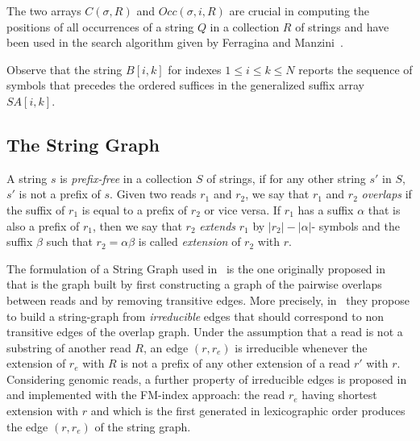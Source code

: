 \documentclass[runningheads,envcountsame,a4paper]{llncs}
\begin{document}

The two arrays $C(\sigma, R)$ and $Occ(\sigma, i, R)$ are crucial in
computing the positions of all occurrences of a string $Q$ in a
collection $R$ of strings and have been used in the search algorithm
given by Ferragina and Manzini~\cite{Ferragina2000}.

Observe that the string $B[i,k]$ for indexes $1 \leq i \leq k \leq N$
reports the sequence of symbols that precedes the ordered suffices in
the generalized suffix array $SA[i,k]$.





\subsection{The String Graph}


A string $s$ is \emph{prefix-free} in a collection $S$ of strings, if
for any other string $s'$ in $S$, $s'$ is not a prefix of $s$.
Given two reads $r_1$ and $r_2$, we say that $r_1$ and $r_2$
\emph{overlaps} if the suffix of $r_1$ is equal to a prefix of $r_2$ or
vice versa.
If $r_1$ has a suffix $\alpha$ that is also a prefix of $r_1$, then we
say that $r_2$ \emph{extends} $r_1$ by $|r_2|- |\alpha|$- symbols and
the suffix $\beta$ such that $r_2 = \alpha \beta$ is called
\emph{extension} of $r_2$ with $r$.

The formulation of a String Graph used in~\cite{Simpson2010} is the one
originally proposed in~\cite{Myers2005} that is the graph built by first
constructing a graph of the pairwise overlaps between reads and by
removing transitive edges.
More precisely, in~\cite{Simpson2010} they propose to build a
string-graph from \emph{irreducible} edges that should correspond to non
transitive edges of the overlap graph.
Under the assumption that a read is not a substring of another read $R$,
an edge $(r, r_e)$ is irreducible whenever the extension of $r_e$ with
$R$ is not a prefix of any other extension of a read $r'$ with $r$.
Considering genomic reads, a further property of irreducible edges is
proposed in~\cite{Simpson2010} and implemented with the FM-index
approach: the read $r_e$ having shortest extension with $r$ and which is
the first generated in lexicographic order produces the edge $(r,r_e)$
of the string graph.
\end{document}
